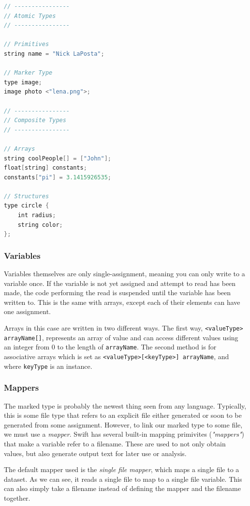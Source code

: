         \begin{lstlisting}[language=swift]
// ----------------
// Atomic Types
// ----------------

// Primitives
string name = "Nick LaPosta";

// Marker Type
type image;
image photo <"lena.png">;

// ----------------
// Composite Types
// ----------------

// Arrays
string coolPeople[] = ["John"];
float[string] constants;
constants["pi"] = 3.1415926535;

// Structures
type circle {
    int radius;
    string color;
};
        \end{lstlisting}

    \subsubsection{Variables}

        Variables themselves are only single-assignment, meaning you can only write to a variable once. If the variable is not yet assigned and attempt to read has been made, the code performing the read is suspended until the variable has been written to. This is the same with arrays, except each of their elements can have one assignment.

        Arrays in this case are written in two different ways. The first way, \texttt{<valueType> arrayName[]}, represents an array of value and can access different values using an integer from 0 to the length of \texttt{arrayName}. The second method is for associative arrays which is set as \texttt{<valueType>[<keyType>] arrayName}, and where \texttt{keyType} is an instance.

    \subsubsection{Mappers}

        The marked type is probably the newest thing seen from any language. Typically, this is some file type that refers to an explicit file either generated or soon to be generated from some assignment. However, to link our marked type to some file, we must use a \textit{mapper}. Swift has several built-in mapping primivites (\textit{"mappers"}) that make a variable refer to a filename. These are used to not only obtain values, but also generate output text for later use or analysis.

        The default mapper used is the \textit{single file mapper}, which maps a single file to a dataset. As we can see, it reads a single file to map to a single file variable. This can also simply take a filename instead of defining the mapper and the filename together. \cite{website:swift-lang-user-guide}

